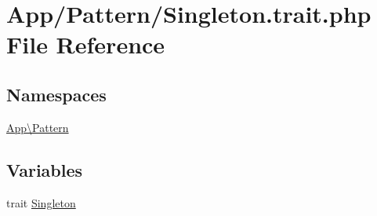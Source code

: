 \hypertarget{_singleton_8trait_8php}{}\section{App/\+Pattern/\+Singleton.trait.\+php File Reference}
\label{_singleton_8trait_8php}
\subsection*{Namespaces}
\begin{DoxyCompactItemize}
\item 
 \hyperlink{namespace_app_1_1_pattern}{App\textbackslash{}\+Pattern}
\end{DoxyCompactItemize}
\subsection*{Variables}
\begin{DoxyCompactItemize}
\item 
trait \hyperlink{namespace_app_1_1_pattern_a90c7994df18fc2d358849f9a46502bc1}{Singleton}
\end{DoxyCompactItemize}
